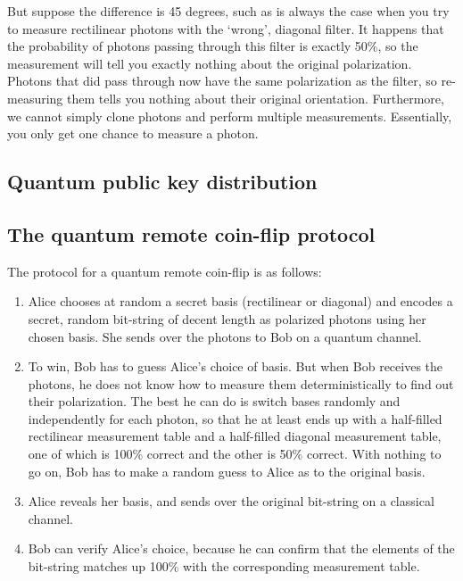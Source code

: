 \documentclass[oneside,a4paper]{article}
\begin{document}
But suppose the difference is 45 degrees, such as is always the case when you try to measure rectilinear photons with the `wrong', diagonal filter. 
It happens that the probability of photons passing through this filter is exactly 50\%, so the measurement will tell you exactly nothing about the original polarization.
Photons that did pass through now have the same polarization as the filter, so re-measuring them tells you nothing about their original orientation.
Furthermore, we cannot simply clone photons and perform multiple measurements.
Essentially, you only get one chance to measure a photon.


\subsection{Quantum public key distribution}


\subsection{The quantum remote coin-flip protocol}
The protocol for a quantum remote coin-flip is as follows:
\begin{enumerate}
	\item
		Alice chooses at random a secret basis (rectilinear or diagonal) and encodes a secret, random bit-string of decent length as polarized photons using her chosen basis.
		She sends over the photons to Bob on a quantum channel.
	\item 
		To win, Bob has to guess Alice's choice of basis.
		But when Bob receives the photons, he does not know how to measure them deterministically to find out their polarization.
		The best he can do is switch bases randomly and independently for each photon, so that he at least ends up with a half-filled rectilinear measurement table and a half-filled diagonal measurement table, one of which is 100\% correct and the other is 50\% correct.
		With nothing to go on, Bob has to make a random guess to Alice as to the original basis.
	\item Alice reveals her basis, and sends over the original bit-string on a classical channel.
	\item Bob can verify Alice's choice, because he can confirm that the elements of the bit-string matches up 100\% with the corresponding measurement table.
\end{enumerate}
\end{document}

